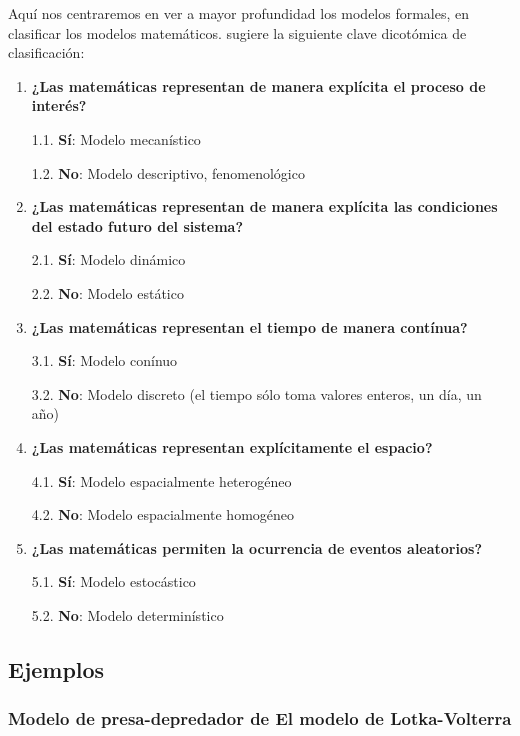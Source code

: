 \documentclass[
]{book}
\begin{document}
Aquí nos centraremos en ver a mayor profundidad los modelos formales, en clasificar los modelos matemáticos. \citet{haefner1998modeling} sugiere la siguiente clave dicotómica de clasificación:

\begin{enumerate}
\def\labelenumi{\arabic{enumi}.}
\item
  \textbf{¿Las matemáticas representan de manera explícita el proceso de interés?}

  1.1. \textbf{Sí}: Modelo mecanístico

  1.2. \textbf{No}: Modelo descriptivo, fenomenológico
\item
  \textbf{¿Las matemáticas representan de manera explícita las condiciones del estado futuro del sistema?}

  2.1. \textbf{Sí}: Modelo dinámico

  2.2. \textbf{No}: Modelo estático
\item
  \textbf{¿Las matemáticas representan el tiempo de manera contínua?}

  3.1. \textbf{Sí}: Modelo conínuo

  3.2. \textbf{No}: Modelo discreto (el tiempo sólo toma valores enteros, un día, un año)
\item
  \textbf{¿Las matemáticas representan explícitamente el espacio?}

  4.1. \textbf{Sí}: Modelo espacialmente heterogéneo

  4.2. \textbf{No}: Modelo espacialmente homogéneo
\item
  \textbf{¿Las matemáticas permiten la ocurrencia de eventos aleatorios?}

  5.1. \textbf{Sí}: Modelo estocástico

  5.2. \textbf{No}: Modelo determinístico
\end{enumerate}

\hypertarget{ejemplos-1}{%
\subsection{Ejemplos}\label{ejemplos-1}}

\hypertarget{modelo-de-presa-depredador-de-el-modelo-de-lotka-volterra--volterra1928variations}{%
\subsubsection{\texorpdfstring{Modelo de presa-depredador de El modelo de Lotka-Volterra \citeyearpar{volterra1928variations}}{Modelo de presa-depredador de El modelo de Lotka-Volterra {[}-@volterra1928variations{]}}}\label{modelo-de-presa-depredador-de-el-modelo-de-lotka-volterra--volterra1928variations}}
\end{document}
